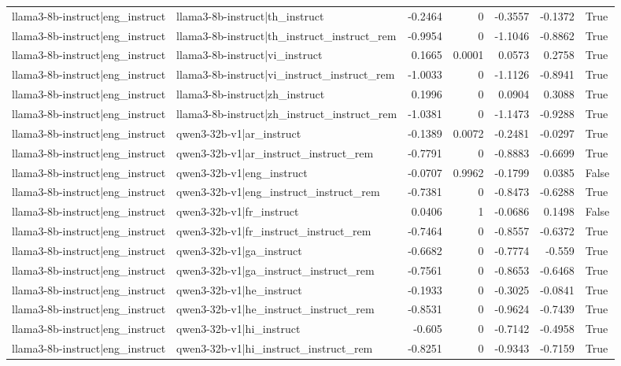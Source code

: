 \begin{table}
\begin{tabular}{l l r r r r l}
llama3-8b-instruct|eng_instruct & llama3-8b-instruct|th_instruct & -0.2464 & 0 & -0.3557 & -0.1372 & True \\
llama3-8b-instruct|eng_instruct & llama3-8b-instruct|th_instruct_instruct_rem & -0.9954 & 0 & -1.1046 & -0.8862 & True \\
llama3-8b-instruct|eng_instruct & llama3-8b-instruct|vi_instruct & 0.1665 & 0.0001 & 0.0573 & 0.2758 & True \\
llama3-8b-instruct|eng_instruct & llama3-8b-instruct|vi_instruct_instruct_rem & -1.0033 & 0 & -1.1126 & -0.8941 & True \\
llama3-8b-instruct|eng_instruct & llama3-8b-instruct|zh_instruct & 0.1996 & 0 & 0.0904 & 0.3088 & True \\
llama3-8b-instruct|eng_instruct & llama3-8b-instruct|zh_instruct_instruct_rem & -1.0381 & 0 & -1.1473 & -0.9288 & True \\
llama3-8b-instruct|eng_instruct & qwen3-32b-v1|ar_instruct & -0.1389 & 0.0072 & -0.2481 & -0.0297 & True \\
llama3-8b-instruct|eng_instruct & qwen3-32b-v1|ar_instruct_instruct_rem & -0.7791 & 0 & -0.8883 & -0.6699 & True \\
llama3-8b-instruct|eng_instruct & qwen3-32b-v1|eng_instruct & -0.0707 & 0.9962 & -0.1799 & 0.0385 & False \\
llama3-8b-instruct|eng_instruct & qwen3-32b-v1|eng_instruct_instruct_rem & -0.7381 & 0 & -0.8473 & -0.6288 & True \\
llama3-8b-instruct|eng_instruct & qwen3-32b-v1|fr_instruct & 0.0406 & 1 & -0.0686 & 0.1498 & False \\
llama3-8b-instruct|eng_instruct & qwen3-32b-v1|fr_instruct_instruct_rem & -0.7464 & 0 & -0.8557 & -0.6372 & True \\
llama3-8b-instruct|eng_instruct & qwen3-32b-v1|ga_instruct & -0.6682 & 0 & -0.7774 & -0.559 & True \\
llama3-8b-instruct|eng_instruct & qwen3-32b-v1|ga_instruct_instruct_rem & -0.7561 & 0 & -0.8653 & -0.6468 & True \\
llama3-8b-instruct|eng_instruct & qwen3-32b-v1|he_instruct & -0.1933 & 0 & -0.3025 & -0.0841 & True \\
llama3-8b-instruct|eng_instruct & qwen3-32b-v1|he_instruct_instruct_rem & -0.8531 & 0 & -0.9624 & -0.7439 & True \\
llama3-8b-instruct|eng_instruct & qwen3-32b-v1|hi_instruct & -0.605 & 0 & -0.7142 & -0.4958 & True \\
llama3-8b-instruct|eng_instruct & qwen3-32b-v1|hi_instruct_instruct_rem & -0.8251 & 0 & -0.9343 & -0.7159 & True \\

\end{tabular}
\end{table}
